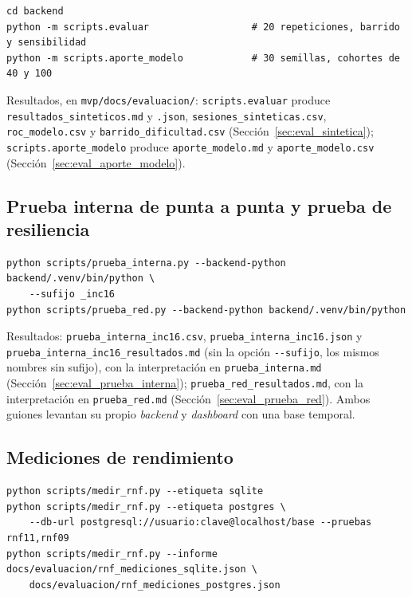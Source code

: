 \begin{footnotesize}
\begin{verbatim}
cd backend
python -m scripts.evaluar                  # 20 repeticiones, barrido y sensibilidad
python -m scripts.aporte_modelo            # 30 semillas, cohortes de 40 y 100
\end{verbatim}
\end{footnotesize}

\noindent Resultados, en \texttt{mvp/docs/evaluacion/}: \texttt{scripts.evaluar} produce \texttt{resultados\_sinteticos.md} y \texttt{.json}, \texttt{sesiones\_sinteticas.csv}, \texttt{roc\_modelo.csv} y \texttt{barrido\_dificultad.csv} (Sección~\ref{sec:eval_sintetica}); \texttt{scripts.aporte\_modelo} produce \texttt{aporte\_modelo.md} y \texttt{aporte\_modelo.csv} (Sección~\ref{sec:eval_aporte_modelo}).

\subsection{Prueba interna de punta a punta y prueba de resiliencia}

\begin{footnotesize}
\begin{verbatim}
python scripts/prueba_interna.py --backend-python backend/.venv/bin/python \
    --sufijo _inc16
python scripts/prueba_red.py --backend-python backend/.venv/bin/python
\end{verbatim}
\end{footnotesize}

\noindent Resultados: \texttt{prueba\_interna\_inc16.csv}, \texttt{prueba\_interna\_inc16.json} y \texttt{prueba\_interna\_inc16\_resultados.md} (sin la opción \verb|--sufijo|, los mismos nombres sin sufijo), con la interpretación en \texttt{prueba\_interna.md} (Sección~\ref{sec:eval_prueba_interna}); \texttt{prueba\_red\_resultados.md}, con la interpretación en \texttt{prueba\_red.md} (Sección~\ref{sec:eval_prueba_red}). Ambos guiones levantan su propio \textit{backend} y \textit{dashboard} con una base temporal.

\subsection{Mediciones de rendimiento}

\begin{footnotesize}
\begin{verbatim}
python scripts/medir_rnf.py --etiqueta sqlite
python scripts/medir_rnf.py --etiqueta postgres \
    --db-url postgresql://usuario:clave@localhost/base --pruebas rnf11,rnf09
python scripts/medir_rnf.py --informe docs/evaluacion/rnf_mediciones_sqlite.json \
    docs/evaluacion/rnf_mediciones_postgres.json
\end{verbatim}
\end{footnotesize}

